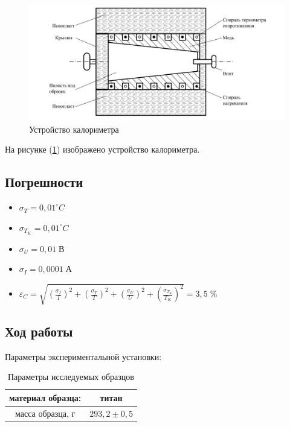 \documentclass[a4paper, 12pt]{article}
\begin{document}
\begin{figure}[h!]
	\begin{center}
		\includegraphics[scale=0.3]{img/ustfig.jpg}
		\caption{Устройство калориметра}
		\label{fig:Ris_of_facility}
	\end{center}
\end{figure}	

На рисунке (\ref{fig:Ris_of_facility}) изображено устройство калориметра.

\begin{center}
	\subsection*{Погрешности}
\end{center}

\begin{itemize}
	\item $\sigma_T = 0,01 ^{\circ}C $
	\item $\sigma_{T_{K}} = 0,01 ^{\circ}C $
	\item $\sigma_U = 0,01 \; \text{В}$
	\item $\sigma_I = 0,0001 \; \text{А}$
	\item $\varepsilon_C = \sqrt{(\frac{\sigma_I}{I})^2 + (\frac{\sigma_T}{T})^2 + (\frac{\sigma_U}{U})^2 + (\frac{\sigma_{T_K}}{T_K})^2} = 3,5 \; \%$
\end{itemize}


\begin{center}
	\section*{Ход работы}
\end{center}


\begin{center}
	Параметры экспериментальной установки:
\end{center}

\begin{table}[h!]
	\centering
	\begin{tabular}{|c|c|}
		\hline
		материал образца: & титан           \\ \hline
		масса образца, г  & $293,2 \pm 0,5$ \\ \hline
	\end{tabular}
	\caption{Параметры исследуемых образцов}
	\label{tab:param_of_facility}
\end{table}
\end{document}
